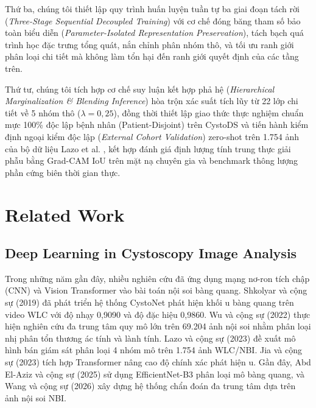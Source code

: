\documentclass[runningheads]{llncs}
\begin{document}
Thứ ba, chúng tôi thiết lập quy trình huấn luyện tuần tự ba giai đoạn tách rời (\textit{Three-Stage Sequential Decoupled Training}) với cơ chế đóng băng tham số bảo toàn biểu diễn (\textit{Parameter-Isolated Representation Preservation}), tách bạch quá trình học đặc trưng tổng quát, nắn chỉnh phân nhóm thô, và tối ưu ranh giới phân loại chi tiết mà không làm tổn hại đến ranh giới quyết định của các tầng trên.

Thứ tư, chúng tôi tích hợp cơ chế suy luận kết hợp phả hệ (\textit{Hierarchical Marginalization \& Blending Inference}) hòa trộn xác suất tích lũy từ 22 lớp chi tiết về 5 nhóm thô ($\lambda=0{,}25$), đồng thời thiết lập giao thức thực nghiệm chuẩn mực 100\% độc lập bệnh nhân (Patient-Disjoint) trên CystoDS và tiến hành kiểm định ngoại kiểm độc lập (\textit{External Cohort Validation}) zero-shot trên 1.754 ảnh của bộ dữ liệu Lazo et al. \cite{ref_lazo2023semisupervised}, kết hợp đánh giá định lượng tính trung thực giải phẫu bằng Grad-CAM IoU \cite{ref_selvaraju2017gradcam} trên mặt nạ chuyên gia và benchmark thông lượng phần cứng biên thời gian thực.

\section{Related Work}
\label{sec:related_work}

\subsection{Deep Learning in Cystoscopy Image Analysis}
Trong những năm gần đây, nhiều nghiên cứu đã ứng dụng mạng nơ-ron tích chập (CNN) và Vision Transformer vào bài toán nội soi bàng quang. Shkolyar và cộng sự (2019) \cite{ref_shkolyar2019augmented} đã phát triển hệ thống CystoNet phát hiện khối u bàng quang trên video WLC với độ nhạy 0,9090 và độ đặc hiệu 0,9860. Wu và cộng sự (2022) \cite{ref_wu2022multicenter} thực hiện nghiên cứu đa trung tâm quy mô lớn trên 69.204 ảnh nội soi nhằm phân loại nhị phân tổn thương ác tính và lành tính. Lazo và cộng sự (2023) \cite{ref_lazo2023semisupervised} đề xuất mô hình bán giám sát phân loại 4 nhóm mô trên 1.754 ảnh WLC/NBI. Jia và cộng sự (2023) \cite{ref_jia2023transformer} tích hợp Transformer nâng cao độ chính xác phát hiện u. Gần đây, Abd El-Aziz và cộng sự (2025) \cite{ref_abdelaziz2025efficientnet} sử dụng EfficientNet-B3 phân loại mô bàng quang, và Wang và cộng sự (2026) \cite{ref_wang2026narrowband} xây dựng hệ thống chẩn đoán đa trung tâm dựa trên ảnh nội soi NBI.
\end{document}
